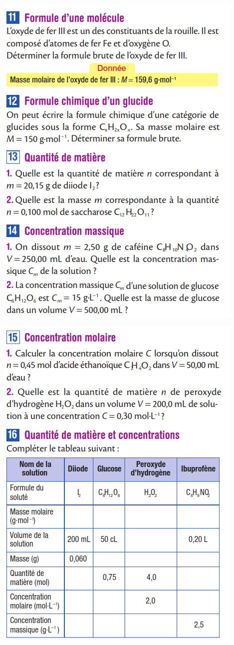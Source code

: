 \documentclass[10pt]{article}
\newcommand{\myscale}{0.41}
\begin{document}
\begin{center}
\begin{minipage}[c]{0.45\textwidth}
		\includegraphics[scale=\myscale]{assets/11-12-13-14.png}

		\includegraphics[scale=\myscale]{assets/15-16.png}


\end{minipage}
\end{center}
\end{document}
